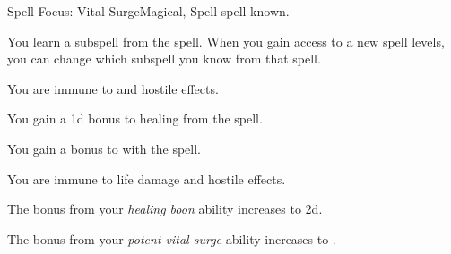     \begin{feat}{Spell Focus: Vital Surge}{Magical, Spell}
        \featpre {} spell known.

         You learn a subspell from the  spell.
        When you gain access to a new spell levels, you can change which subspell you know from that spell.

         You are immune to  and hostile  effects.

         You gain a \plus1d bonus to healing from the  spell.

         You gain a  bonus to  with the  spell.

         You are immune to life damage and hostile  effects.

         The bonus from your \textit{healing boon} ability increases to \plus2d.

         The bonus from your \textit{potent vital surge} ability increases to .
    \end{feat}

